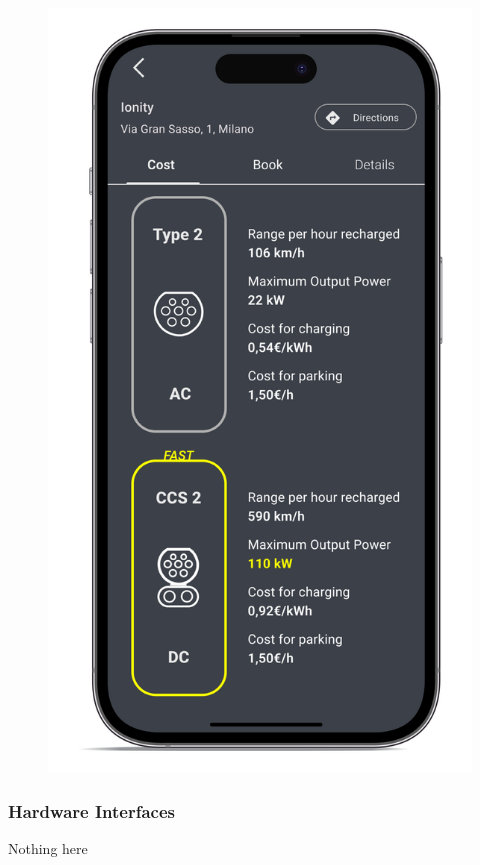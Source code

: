 \begin{figure}[H]
{        \includegraphics[scale=0.1]{src/mockups/book_cost.png}
    }
    \newline
\end{figure}


\subsubsection{Hardware Interfaces}
Nothing here

